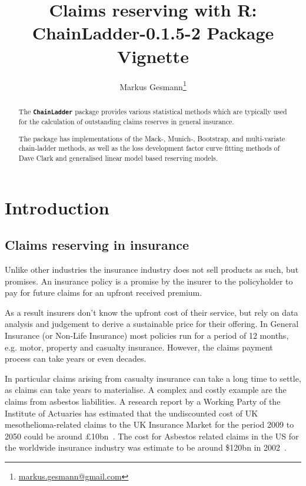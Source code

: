 \documentclass{article}
\newcommand{\chainladder}{\textbf{\texttt{ChainLadder}} }
\begin{document}
\author{Markus
  Gesmann\footnote{\href{mailto:markus.gesmann@gmail.com}{markus.gesmann@gmail.com}}
}

\title{Claims reserving with R:\\
  ChainLadder-0.1.5-2
  Package Vignette 
}
\maketitle
\begin{abstract}
  The \chainladder package provides various statistical methods which
  are typically used for the calculation of outstanding claims reserves
  in general insurance.  
  
  The package has implementations of the Mack-, Munich-, Bootstrap, and
  multi-variate chain-ladder methods, as well as the loss development
  factor curve fitting methods of Dave Clark and generalised linear
  model based reserving models. 
\end{abstract}

\clearpage
\tableofcontents
\clearpage

\section{Introduction}

\subsection{Claims reserving in insurance}
Unlike other industries the insurance industry does not sell products
as such, but promises. An insurance policy is a promise by the insurer
to the policyholder to pay for future claims for an upfront received
premium. 

As a result insurers don't know the upfront cost of their
service, but rely on data analysis and judgement to derive a
sustainable price for their offering. In General Insurance (or Non-Life
Insurance) most policies run for a period of 12 months, e.g. motor,
property and casualty insurance. However, the claims payment process
can take years or even decades. 

In particular claims arising from casualty insurance can take a long
time to settle, as claims can take years to materialise. A complex and
costly example are the claims from asbestos liabilities. 
A research report by a  Working Party of the  Institute of Actuaries
has estimated that the undiscounted cost of UK mesothelioma-related
claims to the UK Insurance Market for the period 2009 to 2050 could be
around $\pounds$10bn~\cite{Gravelsons2009}. The cost for Asbestos
related claims in the US for the worldwide insurance industry was
estimate to be around \$120bn in 2002~\cite{Michaels2002}.  
\end{document}

